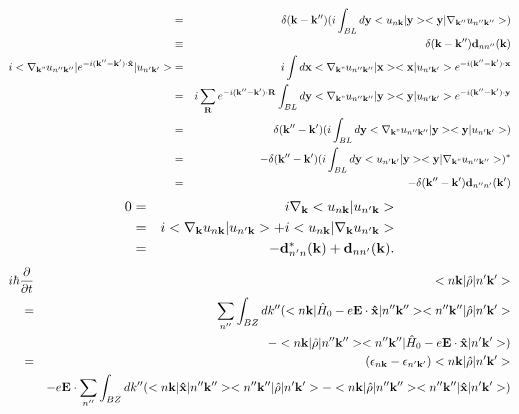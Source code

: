 \documentclass[aps,prb,preprint]{revtex4-1}
\begin{document}
\begin{appendix}
\begin{eqnarray}
&=& \delta({\bf k-k''})  ( i \int_{BL} d{\bf y}  <u_{n{\bf k}}|{\bf y}> <{\bf y}|\nabla_{\bf k''} u_{n''{\bf k''}}> )\nonumber \\
&\equiv& \delta({\bf k-k''}) {\bf d}_{nn''}({\bf k})\\
%
i <\nabla_{\bf k"} u_{n''{\bf k''}}| e^{-i{\bf (k''-k') \cdot \hat{x} }} |u_{n'{\bf k'}}> &=& i \int d{\bf x} <\nabla_{\bf k"} u_{n''{\bf k''}}|{\bf x}> <{\bf x}|u_{n'{\bf k'}}> e^{-i{\bf (k''-k' )\cdot {x}} }\nonumber \\
&=& i\sum_{\bf R} e^{-i{\bf (k''-k' )\cdot {\bf R}} } \int_{BL} d{\bf y} <\nabla_{\bf k"} u_{n''{\bf k''}}|{\bf y}> <{\bf y}|u_{n'{\bf k'}}> e^{-i{\bf (k''-k' )\cdot {y}} }\nonumber \\
&=& \delta({\bf k''-k'}) ( i \int_{BL} d{\bf y} <\nabla_{\bf k"} u_{n''{\bf k''}}|{\bf y}> <{\bf y}|u_{n'{\bf k'}}> )\nonumber \\
&=& - \delta({\bf k''-k'})  (i \int_{BL} d{\bf y} <u_{n'{\bf k'}}|{\bf y}> <{\bf y}|\nabla_{\bf k"} u_{n''{\bf k''}}>)^*\nonumber \\
&=& - \delta({\bf k''-k'}) {\bf d}_{n''n'}({\bf k'})
\end{eqnarray} 
%
\begin{eqnarray}
0 &=& i \nabla_{\bf k} <u_{n{\bf k}}|u_{n'{\bf k}}> \nonumber \\
 &=& i <\nabla_{\bf k} u_{n{\bf k}}|u_{n'{\bf k}}> + i <u_{n{\bf k}}|  \nabla_{\bf k} u_{n'{\bf k}}> \nonumber \\
 &=& - {\bf d}_{n'n}^*({\bf k}) + {\bf d}_{nn'}({\bf k}). 
 \end{eqnarray} 
\begin{eqnarray}\label{eq:BL} 
i \hbar \frac{ \partial }{\partial t } &&<n{\bf k}| \hat{\rho} |n'{\bf k'}> \nonumber \\
= && \sum_{n''} \int_{BZ} dk''  ( <n{\bf k}| \hat{H}_0 -e{\bf E} \cdot {\bf \hat{x}} |n''{\bf k''}><n''{\bf k''}| \hat{\rho} |n'{\bf k'}> \nonumber  \\
&&- <n{\bf k}| \hat{\rho} |n''{\bf k''}><n''{\bf k''}| \hat{H}_0 -e{\bf E} \cdot {\bf \hat{x}}  |n'{\bf k'}> )\nonumber  \\
= && (\epsilon_{n{\bf k}}-\epsilon_{n'{\bf k'}}) <n{\bf k}| \hat{\rho} |n'{\bf k'}> \nonumber  \\
&&-e{\bf E} \cdot \sum_{n''}\int_{BZ} dk'' ( <n{\bf k}| {\bf \hat{x}} |n''{\bf k''}> <n''{\bf k''}| \hat{\rho} |n'{\bf k'}> - <n{\bf k}| \hat{\rho} |n''{\bf k''}> <n''{\bf k''}| {\bf \hat{x}} |n'{\bf k'}> ) \nonumber  \\

\end{eqnarray}
\end{appendix}
\end{document}
